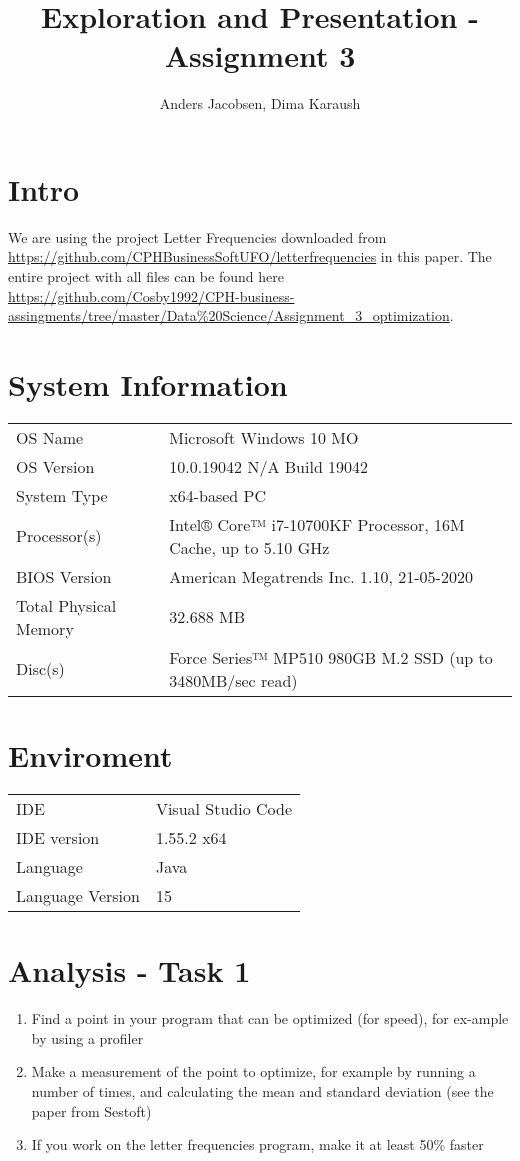 \documentclass{article}
\author{Anders Jacobsen, Dima Karaush}
\title{Exploration and Presentation - Assignment 3}
\begin{document}
\maketitle

\newpage
\tableofcontents

\newpage
\section{Intro}
We are using the project Letter Frequencies downloaded 
from \url{https://github.com/CPHBusinessSoftUFO/letterfrequencies} 
in this paper. The entire project with all files can be found here 
\url{https://github.com/Cosby1992/CPH-business-assingments/tree/master/Data%20Science/Assignment_3_optimization}.

\section{System Information}
\begin{tabular}{ l l }
OS Name                 & Microsoft Windows 10 MO \\ 
OS Version              & 10.0.19042 N/A Build 19042 \\  
System Type             & x64-based PC \\
Processor(s)            & Intel® Core™ i7-10700KF Processor, 16M Cache, up to 5.10 GHz \\
BIOS Version            & American Megatrends Inc. 1.10, 21-05-2020 \\
Total Physical Memory   & 32.688 MB \\ 
Disc(s)                 & Force Series™ MP510 980GB M.2 SSD (up to 3480MB/sec read)
\end{tabular}

\section{Enviroment}
\begin{tabular}{ l l }
IDE                     & Visual Studio Code \\ 
IDE version             & 1.55.2 x64 \\  
Language                & Java \\
Language Version        & 15 \\
\end{tabular}

\section{Analysis - Task 1}
\begin{enumerate}
    \item Find a point in your program that can be optimized (for speed), 
    for ex-ample by using a profiler
    \item Make a measurement of the point to optimize, for example by 
    running a number of times, and calculating the mean and standard 
    deviation (see the paper from Sestoft)
    \item If you work on the letter frequencies program, make it at least 50\% faster
\end{enumerate}
\end{document}
